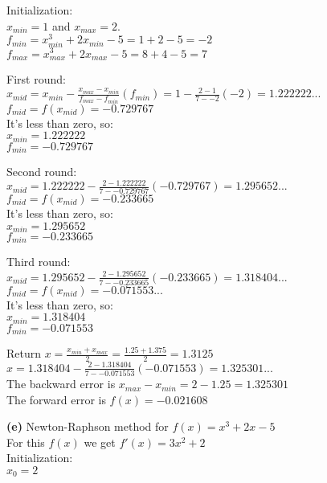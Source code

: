 \documentclass[11pt,letterpaper]{article}
\renewcommand{\part}[1] {\vspace{.10in} {\bf (#1)}}
\begin{document}
Initialization:\\
$x_{min} = 1$ and $x_{max} = 2$.\\
$f_{min} = x_{min}^{3} + 2x_{min} - 5 = 1 + 2 - 5 = -2$\\
$f_{max} = x_{max}^{3} + 2x_{max} - 5 = 8 + 4 - 5 = 7$\\

\newcommand{\xmid}[4]{{#1} - \frac{{#2} - {#1}}{{#4} - {#3}}({#3})}

First round:\\
$x_{mid} = \xmid{x_{min}}{x_{max}}{f_{min}}{f_{max}} = \xmid{1}{2}{{-2}}{7} = 1.222222...$\\
$f_{mid} = f(x_{mid}) = -0.729767 $\\
It's less than zero, so:\\
$x_{min} = 1.222222$\\
$f_{min} = -0.729767$

Second round:\\
$x_{mid} = \xmid{1.222222}{2}{{-0.729767}}{7} = 1.295652...$\\
$f_{mid} = f(x_{mid}) = -0.233665 $\\
It's less than zero, so:\\
$x_{min} = 1.295652 $\\
$f_{min} = -0.233665 $

Third round:\\
$x_{mid}  = \xmid{1.295652}{2}{{-0.233665}}{7} = 1.318404...$\\
$f_{mid} = f(x_{mid}) = -0.071553... $\\
It's less than zero, so:\\
$x_{min} = 1.318404$\\
$f_{min} = -0.071553$

Return $x = \frac{x_{min} + x_{max}}{2} = \frac{1.25 + 1.375}{2} = 1.3125$\\
$x = \xmid{1.318404}{2}{{-0.071553}}{7} = 1.325301...$\\
The backward error is $x_{max} - x_{min} = 2 - 1.25 = 1.325301 $\\
The forward error is $f(x) = -0.021608$

\part{e}
Newton-Raphson method for $f(x) = x^{3} + 2x - 5$\\
For this $f(x)$ we get $f'(x) = 3x^{2} + 2$\\

Initialization:\\
$x_0 = 2$
\end{document}
